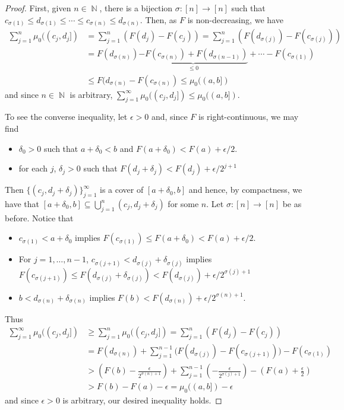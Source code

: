 \documentclass[11pt, a4paper]{memoir}
\DeclareMathOperator{\N}{{\mathbb{N}}}
\theoremstyle{change}
\theoremstyle{plain}
\theoremstyle{nonumberplain}
\newtheorem{proof}{Proof}
\numberwithin{equation}{section}
\begin{document}
\begin{proof}
    First, given $n\in\N$, there is a bijection $\sigma:[n]\to[n]$ such that $c_{\sigma(1)}\leq d_{\sigma(1)}\leq\cdots\leq c_{\sigma(n)}\leq d_{\sigma(n)}$.
    Then, as $F$ is non-decreasing, we have
    \begin{align*}
        \sum_{j=1}^n \mu_0((c_j,d_j]) &= \sum_{j=1}^n (F(d_j)-F(c_j))= \sum_{j=1}^n (F(d_{\sigma(j)})-F(c_{\sigma(j)}))\\
                                             &= F(d_{\sigma(n)})\underbrace{-F(c_{\sigma(n)})+F(d_{\sigma(n-1)})}_{\leq 0}+\cdots-F(c_{\sigma(1)})\\
                                             &\leq F(d_{\sigma(n)}-F(c_{\sigma(n)})\leq \mu_0((a,b])
    \end{align*}
    and since $n\in\N$ is arbitrary, $\sum_{j=1}^\infty \mu_0((c_j,d_j])\leq\mu_0((a,b])$.

    To see the converse inequality, let $\epsilon>0$ and, since $F$ is right-continuous, we may find
    \begin{itemize}[nolistsep]
        \item $\delta_0>0$ such that $a+\delta_0<b$ and $F(a+\delta_0)<F(a)+\epsilon/2$.
        \item for each $j$, $\delta_j>0$ such that $F(d_j+\delta_j)<F(d_j)+\epsilon/2^{j+1}$
    \end{itemize}
    Then $\{(c_j,d_j+\delta_j)\}_{j=1}^\infty$ is a cover of $[a+\delta_0,b]$ and hence, by compactness, we have that $[a+\delta_0,b]\subseteq\bigcup_{j=1}^n(c_j,d_j+\delta_j)$ for some $n$.
    Let $\sigma:[n]\to[n]$ be as before.
    Notice that
    \begin{itemize}[nl]
        \item $c_{\sigma(1)}<a+\delta_0$ implies $F(c_{\sigma(1)})\leq F(a+\delta_0)<F(a)+\epsilon/2$.
        \item For $j=1,\ldots,n-1$, $c_{\sigma(j+1)}<d_{\sigma(j)}+\delta_{\sigma(j)}$ implies $F(c_{\sigma(j+1)})\leq F(d_{\sigma(j)}+\delta_{\sigma(j)})<F(d_{\sigma(j)})+\epsilon/2^{\sigma(j)+1}$
        \item $b<d_{\sigma(n)}+\delta_{\sigma(n)}$ implies $F(b)<F(d_{\sigma(n)})+\epsilon/2^{\sigma(n)+1}$.
    \end{itemize}
    Thus
    \begin{align*}
        \sum_{j=1}^\infty \mu_0((c_j,d_j]) &\geq \sum_{j=1}^n \mu_0((c_j,d_j])= \sum_{j=1}^n(F(d_j)-F(c_j))\\
                                           &= F(d_{\sigma(n)})+\sum_{j=1}^{n-1}\bigl(F(d_{\sigma(j)})-F(c_{\sigma(j+1)})\bigr)-F(c_{\sigma(1)})\\
                                           &> \left(F(b)-\frac{\epsilon}{2^{\sigma(n)+1}}\right)+\sum_{j=1}^{n-1}\left(-\frac{\epsilon}{2^{\sigma(j)+1}}\right)-\left(F(a)+\frac{\epsilon}{2}\right)\\
                                           &> F(b)-F(a)-\epsilon=\mu_0((a,b])-\epsilon
    \end{align*}
    and since $\epsilon>0$ is arbitrary, our desired inequality holds.
\end{proof}
\end{document}
